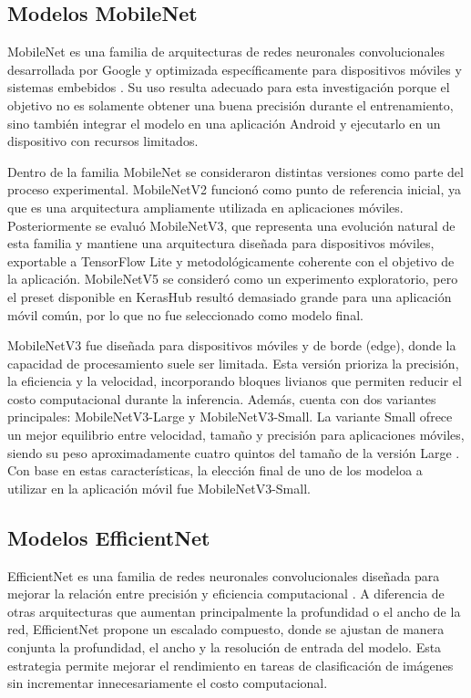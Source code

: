 \subsection{Modelos MobileNet}
MobileNet es una familia de arquitecturas de redes neuronales convolucionales desarrollada por Google y optimizada específicamente
para dispositivos móviles y sistemas embebidos \cite{howard2017mobilenetsefficientconvolutionalneural}. Su uso resulta adecuado para
esta investigación porque el objetivo no es solamente obtener una buena precisión durante el entrenamiento, sino también integrar el
modelo en una aplicación Android y ejecutarlo en un dispositivo con recursos limitados.

Dentro de la familia MobileNet se consideraron distintas versiones como parte del proceso experimental. MobileNetV2 funcionó como punto
de referencia inicial, ya que es una arquitectura ampliamente utilizada en aplicaciones móviles. Posteriormente se evaluó MobileNetV3,
que representa una evolución natural de esta familia y mantiene una arquitectura diseñada para dispositivos móviles, exportable a
TensorFlow Lite y metodológicamente coherente con el objetivo de la aplicación. MobileNetV5 se consideró como un experimento exploratorio,
pero el preset disponible en KerasHub resultó demasiado grande para una aplicación móvil común, por lo que no fue seleccionado como
modelo final.

MobileNetV3 fue diseñada para dispositivos móviles y de borde (edge), donde la capacidad de procesamiento suele ser limitada. Esta
versión prioriza la precisión, la eficiencia y la velocidad, incorporando bloques livianos que permiten reducir el costo computacional
durante la inferencia. Además, cuenta con dos variantes principales: MobileNetV3-Large y MobileNetV3-Small. La variante Small ofrece un
mejor equilibrio entre velocidad, tamaño y precisión para aplicaciones móviles, siendo su peso aproximadamente cuatro quintos del tamaño
de la versión Large \cite{li2022mobilenetv3}. Con base en estas características, la elección final de uno de los modeloa a utilizar en la aplicación
móvil fue MobileNetV3-Small.


\subsection{Modelos EfficientNet}
EfficientNet es una familia de redes neuronales convolucionales diseñada para mejorar la relación entre precisión y eficiencia
computacional \cite{tan2020efficientnetrethinkingmodelscaling}. A diferencia de otras arquitecturas que aumentan principalmente la
profundidad o el ancho de la red, EfficientNet propone un escalado compuesto, donde se ajustan de manera conjunta la profundidad, el
ancho y la resolución de entrada del modelo. Esta estrategia permite mejorar el rendimiento en tareas de clasificación de imágenes sin
incrementar innecesariamente el costo computacional.

